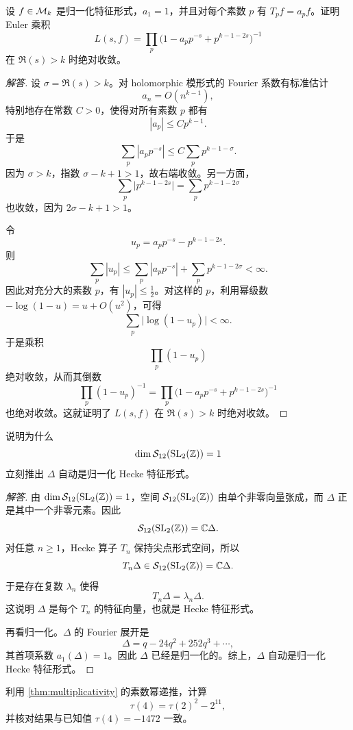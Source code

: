 \begin{exercise}
\label{ex:euler-product-convergence}
设 $f\in \mathcal{M}_k$ 是归一化特征形式，$a_1=1$，并且对每个素数 $p$ 有
$T_pf=a_pf$。证明 Euler 乘积
\[
  L(s,f)=\prod_p\bigl(1-a_pp^{-s}+p^{k-1-2s}\bigr)^{-1}
\]
在 $\Re(s)>k$ 时绝对收敛。
\end{exercise}

\begin{proof}[解答]
设 $\sigma=\Re(s)>k$。对 holomorphic 模形式的 Fourier 系数有标准估计
\[
  a_n=O(n^{k-1}),
\]
特别地存在常数 $C>0$，使得对所有素数 $p$ 都有
\[
  |a_p|\le Cp^{k-1}.
\]
于是
\[
  \sum_p |a_pp^{-s}|
  \le C\sum_p p^{k-1-\sigma}.
\]
因为 $\sigma>k$，指数 $\sigma-k+1>1$，故右端收敛。另一方面，
\[
  \sum_p \bigl|p^{k-1-2s}\bigr|=\sum_p p^{k-1-2\sigma}
\]
也收敛，因为 $2\sigma-k+1>1$。

令
\[
  u_p=a_pp^{-s}-p^{k-1-2s}.
\]
则
\[
  \sum_p |u_p|
  \le \sum_p |a_pp^{-s}|+\sum_p p^{k-1-2\sigma}<\infty.
\]
因此对充分大的素数 $p$，有 $|u_p|\le \tfrac12$。对这样的 $p$，利用幂级数
$-\log(1-u)=u+O(u^2)$，可得
\[
  \sum_p \bigl|\log(1-u_p)\bigr|<\infty.
\]
于是乘积
\[
  \prod_p (1-u_p)
\]
绝对收敛，从而其倒数
\[
  \prod_p (1-u_p)^{-1}
  =\prod_p\bigl(1-a_pp^{-s}+p^{k-1-2s}\bigr)^{-1}
\]
也绝对收敛。这就证明了 $L(s,f)$ 在 $\Re(s)>k$ 时绝对收敛。
\end{proof}

\begin{exercise}
\label{ex:delta-auto-eigenform}
说明为什么
\[
  \dim \mathcal{S}_{12}(\mathrm{SL}_2(\mathbb{Z}))=1
\]
立刻推出 $\Delta$ 自动是归一化 Hecke 特征形式。
\end{exercise}

\begin{proof}[解答]
由 $\dim \mathcal{S}_{12}(\mathrm{SL}_2(\mathbb{Z}))=1$，空间 $\mathcal{S}_{12}(\mathrm{SL}_2(\mathbb{Z}))$ 由单个非零向量张成，而 $\Delta$ 正是其中一个非零元素。因此
\[
  \mathcal{S}_{12}(\mathrm{SL}_2(\mathbb{Z}))=\mathbb{C}\Delta.
\]
对任意 $n\ge1$，Hecke 算子 $T_n$ 保持尖点形式空间，所以
\[
  T_n\Delta\in \mathcal{S}_{12}(\mathrm{SL}_2(\mathbb{Z}))=\mathbb{C}\Delta.
\]
于是存在复数 $\lambda_n$ 使得
\[
  T_n\Delta=\lambda_n\Delta.
\]
这说明 $\Delta$ 是每个 $T_n$ 的特征向量，也就是 Hecke 特征形式。

再看归一化。$\Delta$ 的 Fourier 展开是
\[
  \Delta=q-24q^2+252q^3+\cdots,
\]
其首项系数 $a_1(\Delta)=1$。因此 $\Delta$ 已经是归一化的。综上，$\Delta$ 自动是归一化 Hecke 特征形式。
\end{proof}

\begin{exercise}
\label{ex:tau-four}
利用 \cref{thm:multiplicativity} 的素数幂递推，计算
\[
  \tau(4)=\tau(2)^2-2^{11},
\]
并核对结果与已知值 $\tau(4)=-1472$ 一致。
\end{exercise}

